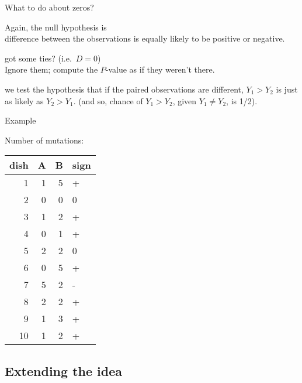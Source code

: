 \begin{frame}{What to do about zeros?}

  Again, the null hypothesis is \\
  \hspace{2em}  difference between the observations is equally likely to be positive or negative.

    \vspace{2em}

     got some ties?  (i.e.\ $D=0$) \\
    \alert{Ignore them;} compute the $P$-value as if they weren't there.

    \vspace{2em}

     we test the hypothesis that \alert{if the paired observations are different}, $Y_1>Y_2$ is just as likely as $Y_2>Y_1$.  (and so, chance of $Y_1>Y_2$, given $Y_1 \neq Y_2$, is 1/2).

\end{frame}


\begin{frame}{Example}

        Number of mutations:
  \begin{center}
  \begin{tabular}{rrrl}
    \hline
  dish & A & B & sign \\ 
    \hline
    1 &   1 &   5 & + \\ 
    2 &   0 &   0 & 0 \\ 
    3 &   1 &   2 & + \\ 
    4 &   0 &   1 & + \\ 
    5 &   2 &   2 & 0 \\ 
    6 &   0 &   5 & + \\ 
    7 &   5 &   2 & - \\ 
    8 &   2 &   2 & + \\ 
    9 &   1 &   3 & + \\ 
    10 &   1 &   2 & + \\ 
     \hline
  \end{tabular}
  \end{center}

\end{frame}


\subsection{Extending the idea}


